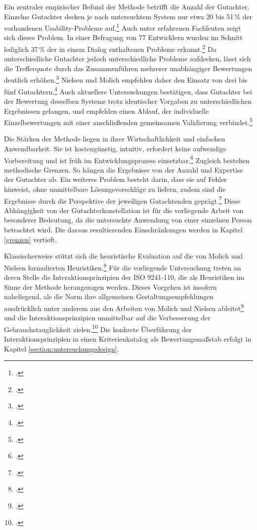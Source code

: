 Ein zentraler empirischer Befund der Methode betrifft die Anzahl der Gutachter. Einzelne
Gutachter decken je nach untersuchtem System nur etwa 20 bis 51\,\% der vorhandenen
Usability-Probleme auf.\footcite[Vgl.][S. 249]{nielsen1990heuristic} Auch unter erfahrenen
Fachleuten zeigt sich dieses Problem. In einer Befragung von 77 Entwicklern wurden im
Schnitt lediglich 37\,\% der in einem Dialog enthaltenen Probleme
erkannt.\footcite[Vgl.][S. 340]{molich1990improving} Da unterschiedliche Gutachter jedoch
unterschiedliche Probleme aufdecken, lässt sich die Trefferquote durch das Zusammenführen
mehrerer unabhängiger Bewertungen deutlich
erhöhen.\footcite[Vgl.][S. 253]{nielsen1990heuristic} Nielsen und Molich empfehlen daher den
Einsatz von drei bis fünf Gutachtern.\footcite[Vgl.][S. 254]{nielsen1990heuristic} Auch
aktuellere Untersuchungen bestätigen, dass Gutachter bei der Bewertung desselben Systems
trotz identischer Vorgaben zu unterschiedlichen Ergebnissen gelangen, und empfehlen einen
Ablauf, der individuelle Einzelbewertungen mit einer anschließenden gemeinsamen Validierung
verbindet.\footcite[Vgl.][S. 363]{inal2021collaborative}

Die Stärken der Methode liegen in ihrer Wirtschaftlichkeit und einfachen Anwendbarkeit. Sie
ist kostengünstig, intuitiv, erfordert keine aufwendige Vorbereitung und ist früh im
Entwicklungsprozess einsetzbar.\footcite[Vgl.][S. 254]{nielsen1990heuristic} Zugleich
bestehen methodische Grenzen. So hängen die Ergebnisse von  der Anzahl und Expertise der Gutachter
ab. Ein weiteres Problem besteht darin, dass sie auf Fehler hinweist, ohne unmittelbare Lösungsvorschläge zu liefern,
zudem sind die Ergebnisse durch die Perspektive der jeweiligen Gutachtenden 
geprägt.\footcite[Vgl.][S. 254]{nielsen1990heuristic} Diese Abhängigkeit von der
Gutachterkonstellation ist für die vorliegende Arbeit von besonderer Bedeutung, da die
untersuchte Anwendung von einer einzelnen Person betrachtet wird. Die daraus resultierenden
Einschränkungen werden in Kapitel \ref{grenzen} vertieft.

Klassischerweise stützt sich die heuristische Evaluation auf die von Molich und Nielsen
formulierten Heuristiken.\footcite[Vgl.][S. 338]{molich1990improving} Für die vorliegende
Untersuchung treten an deren Stelle die Interaktionsprinzipien der ISO 9241-110, die als
Heuristiken im Sinne der Methode herangezogen werden. Dieses Vorgehen ist insofern
naheliegend, als die Norm ihre allgemeinen Gestaltungsempfehlungen ausdrücklich unter
anderem aus den Arbeiten von Molich und Nielsen
ableitet\footcite[Vgl.][Einleitung]{DIN_ISO_9241-110:2020} und die Interaktionsprinzipien
unmittelbar auf die Verbesserung der Gebrauchstauglichkeit
zielen.\footcite[Vgl.][Abschnitt 4.4]{DIN_ISO_9241-110:2020} Die konkrete Überführung der
Interaktionsprinzipien in einen Kriterienkatalog als Bewertungsmaßstab erfolgt in Kapitel
\ref{section:untersuchungsdesign}.

